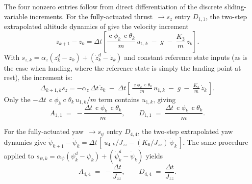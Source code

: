 \documentclass[conf]{new-aiaa}
\DeclareMathOperator{\cs}{c}
\begin{document}
The four nonzero entries follow from direct differentiation of the discrete sliding-variable increments. For the fully-actuated thrust~$\to s_z$ entry $D_{1,1}$, the two-step extrapolated altitude dynamics of \cite{refs:Xiong2016} give the velocity increment
\small
\begin{equation}
\label{eq:sat-ddz-evolution}
\dot z_{k+1} - \dot z_k = \Delta t \left[ \frac{\cs\phi_k\, \cs\theta_k}{m}\, u_{1,k} \;-\; g \;-\; \frac{K_3}{m}\,\dot z_k \right].
\end{equation}
\normalsize
With $s_{z,k} = \alpha_z(z_k^d - z_k) + (\dot z_k^d - \dot z_k)$ and constant reference state inputs (as is the case when landing, where the reference state is simply the landing point at rest), the increment is:
\small
\begin{equation}
\Delta_{k+1,k} s_z
= -\alpha_z\, \Delta t\, \dot z_k \;-\; \Delta t\!\left[\, \tfrac{\cs\phi_k\, \cs\theta_k}{m}\, u_{1,k} \;-\; g \;-\; \tfrac{K_3}{m}\,\dot z_k \,\right].
\end{equation}
\normalsize
Only the $-\Delta t\, \cs\phi_k \cs\theta_k\, u_{1,k}/m$ term contains $u_{1,k}$, giving
\begin{equation}
\label{eq:sat-A-thrust}
A_{1,1} \;=\; -\frac{\Delta t\,\cs\phi_k\, \cs\theta_k}{m},
\qquad
D_{1,1} \;=\; \frac{\Delta t\,\cs\phi_k\, \cs\theta_k}{m}.
\end{equation}

For the fully-actuated yaw~$\to s_\psi$ entry $D_{4,4}$, the two-step extrapolated yaw dynamics give $\dot\psi_{k+1} - \dot\psi_k = \Delta t\,[\, u_{4,k}/J_{zz} - (K_6/J_{zz})\,\dot\psi_k\,]$. The same procedure applied to $s_{\psi,k} = \alpha_\psi(\psi_k^d - \psi_k) + (\dot\psi_k^d - \dot\psi_k)$ yields
\begin{equation}
A_{4,4} \;=\; -\frac{\Delta t}{J_{zz}},
\qquad
D_{4,4} \;=\; \frac{\Delta t}{J_{zz}}.
\end{equation}
\end{document}
